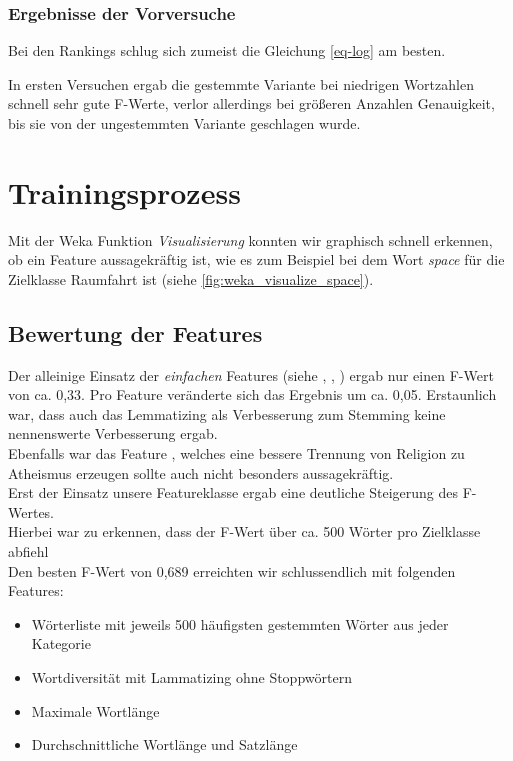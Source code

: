 \documentclass[
	11pt,
	a4paper
]{scrartcl}
\begin{document}
\subsubsection{Ergebnisse der Vorversuche}

Bei den Rankings schlug sich zumeist die Gleichung \ref{eq-log} am besten.

In ersten Versuchen ergab die gestemmte Variante bei niedrigen Wortzahlen schnell sehr gute F-Werte, verlor allerdings bei größeren Anzahlen Genauigkeit, bis sie von der ungestemmten Variante geschlagen wurde.

\section{Trainingsprozess}\label{trainingsprozess}
Mit der Weka Funktion \emph{Visualisierung} konnten wir graphisch schnell erkennen, ob ein Feature aussagekräftig ist, wie es zum
Beispiel bei dem Wort \emph{space} für die Zielklasse Raumfahrt ist (siehe \autoref{fig:weka_visualize_space}).

\subsection{Bewertung der Features}
Der alleinige Einsatz der \emph{einfachen} Features (siehe \emph{}, \emph{},
\emph{}) ergab nur einen F-Wert von ca. 0,33. Pro Feature veränderte sich das Ergebnis um ca. 0,05. Erstaunlich
war, dass auch das Lemmatizing als Verbesserung zum Stemming keine nennenswerte Verbesserung ergab.\\
Ebenfalls war das Feature \emph{}, welches eine bessere Trennung von Religion zu Atheismus erzeugen sollte auch nicht
besonders aussagekräftig.\\
Erst der Einsatz unsere Featureklasse \emph{} ergab eine deutliche Steigerung des F-Wertes.\\
Hierbei war zu erkennen, dass der F-Wert über ca. 500 Wörter pro Zielklasse abfiehl\\

Den besten F-Wert von 0,689 erreichten wir schlussendlich mit folgenden Features:
\begin{itemize}[itemsep=0pt,parsep=0pt, topsep=0pt]
	\item Wörterliste mit jeweils 500 häufigsten gestemmten Wörter aus jeder Kategorie
	\item Wortdiversität mit Lammatizing ohne Stoppwörtern
	\item Maximale Wortlänge
	\item Durchschnittliche Wortlänge und Satzlänge
\end{itemize}
\end{document}
